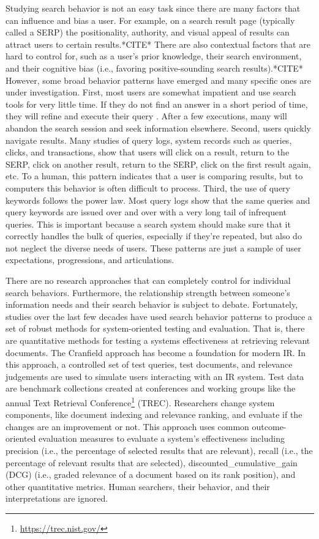 Studying search behavior is not an easy task since there are many factors that can influence and bias a user. For example, on a search result page (typically called a \acrshort{SERP}) the positionality, authority, and visual appeal of results can attract users to certain results.*CITE* There are also contextual factors that are hard to control for, such as a user's prior knowledge, their search environment, and their cognitive bias (i.e., favoring positive-sounding search results).*CITE* However, some broad behavior patterns have emerged and many specific ones are under investigation. First, most users are somewhat impatient and use search tools for very little time. If they do not find an answer in a short period of time, they will refine and execute their query . After a few executions, many will abandon the search session and seek information elsewhere. Second, users quickly navigate results. Many studies of query logs, system records such as queries, clicks, and transactions, show that users will click on a result, return to the SERP, click on another result, return to the SERP, click on the first result again, etc. To a human, this pattern indicates that a user is comparing results, but to computers this behavior is often difficult to process. Third, the use of query keywords follows the power law. Most query logs show that the same queries and query keywords are issued over and over with a very long tail of infrequent queries. This is important because a search system should make sure that it correctly handles the bulk of queries, especially if they're repeated, but also do not neglect the diverse needs of users. These patterns are just a sample of user expectations, progressions, and articulations.

There are no research approaches that can completely control for individual search behaviors. Furthermore, the relationship strength between someone's information needs and their search behavior is subject to debate. Fortunately, studies over the last few decades have used search behavior patterns to produce a set of robust methods for system-oriented testing and evaluation. That is, there are quantitative methods for testing a systems effectiveness at retrieving relevant documents. The Cranfield approach has become a foundation for modern IR. In this approach, a controlled set of test queries, test documents, and relevance judgements are used to simulate users interacting with an IR system. Test data are benchmark collections created at conferences and working groups like the annual Text Retrieval Conference\footnote{\url{https://trec.nist.gov/}} (\acrshort{TREC}). Researchers change system components, like document indexing and relevance ranking, and evaluate if the changes are an improvement or not. This approach uses common outcome-oriented evaluation measures to evaluate a system's effectiveness including precision (i.e., the percentage of selected results that are relevant), recall (i.e., the percentage of relevant results that are selected), \gls{discounted_cumulative_gain} (\acrshort{DCG}) (i.e., graded relevance of a document based on its rank position), and other quantitative metrics. Human searchers, their behavior, and their interpretations are ignored.

